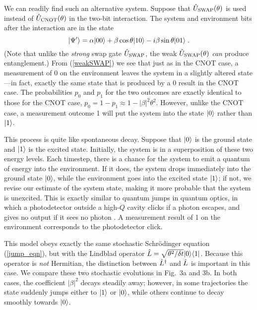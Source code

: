 We can readily find such an alternative system.
Suppose that ${\hat U}_{\rm SWAP}(\theta)$
is used instead of
${\hat U}_{\rm CNOT}(\theta)$
in the two-bit interaction.  The system and environment bits
after the interaction are in the state
\begin{equation}
{| \Psi' \rangle} = \alpha{| 00 \rangle} + \beta\cos\theta{| 10 \rangle}
  - i \beta\sin\theta{| 01 \rangle} \;.
\label{weakSWAP}
\end{equation}
(Note that unlike the {\it strong} swap gate ${\hat U}_{\rm SWAP}$, the weak
${\hat U}_{\rm SWAP}(\theta)$ {\it can} produce entanglement.)
From (\ref{weakSWAP}) we see that just as in the CNOT case,
a measurement of 0 on the environment leaves the system in a slightly
altered state---in fact, exactly the same state that is produced by a 0
result in the CNOT case.  The probabilities $p_0$ and $p_1$ for the two
outcomes are exactly identical to those for the CNOT case,
$p_0 = 1 - p_1 \approx 1 - |\beta|^2\theta^2$.  However, unlike
the CNOT case, a measurement outcome 1 will put the system
into the state ${| 0 \rangle}$ rather than ${| 1 \rangle}$.

This process is quite like spontaneous decay.  Suppose that ${| 0 \rangle}$
is the ground state and ${| 1 \rangle}$ is the excited state.  Initially, the
system is in a superposition of these two energy levels.  Each timestep,
there is a chance for the system to emit a quantum of energy into the
environment.  If it does, the system drops immediately into
the ground state ${| 0 \rangle}$, while the environment goes into the
excited state ${| 1 \rangle}$; if not, we revise our estimate of the system state,
making it more probable that the system is unexcited.  This is exactly
similar to quantum jumps in quantum optics, in which
a photodetector outside a high-$Q$ cavity clicks if a photon escapes,
and gives no output if it sees no photon \cite{Carmichael,Dum,Gardiner}.
A measurement result of 1 on the environment corresponds to the
photodetector click.

This model obeys exactly the same stochastic Schr\"odinger equation
(\ref{jump_eqn}), but with the Lindblad operator
${\hat L} = \sqrt{\theta^2/\delta t}{| 0 \rangle}{\langle 1 |}$.  Because this operator
is {\it not} Hermitian, the distinction between ${\hat L^\dagger}$ and ${\hat L}$ is important
in this case.
We compare these two stochastic evolutions in Fig.~3a and 3b.  In both
cases, the coefficient $|\beta|^2$ decays steadily away; however, in
some trajectories the state suddenly jumps either to ${| 1 \rangle}$ or ${| 0 \rangle}$,
while others continue to decay smoothly towards ${| 0 \rangle}$.

